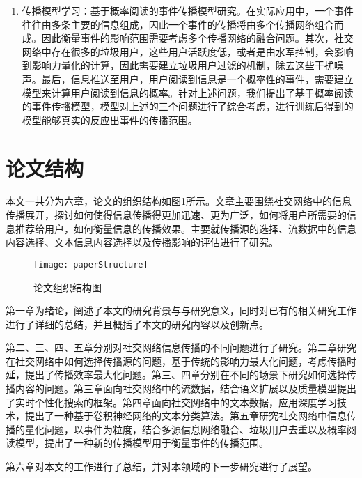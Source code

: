\begin{enumerate}
	\item 传播模型学习：基于概率阅读的事件传播模型研究。在实际应用中，一个事件往往由多条主要的信息组成，因此一个事件的传播将由多个传播网络组合而成。因此衡量事件的影响范围需要考虑多个传播网络的融合问题。其次，社交网络中存在很多的垃圾用户，这些用户活跃度低，或者是由水军控制，会影响到影响力量化的计算，因此需要建立垃圾用户过滤的机制，除去这些干扰噪声。最后，信息推送至用户，用户阅读到信息是一个概率性的事件，需要建立模型来计算用户阅读到信息的概率。针对上述问题，我们提出了基于概率阅读的事件传播模型，模型对上述的三个问题进行了综合考虑，进行训练后得到的模型能够真实的反应出事件的传播范围。
\end{enumerate}
\section{论文结构}
\label{sec1:paperStructure}
本文一共分为六章，论文的组织结构如图\ref{fig:paperStructure}所示。文章主要围绕社交网络中的信息传播展开，探讨如何使得信息传播得更加迅速、更为广泛，如何将用户所需要的信息推荐给用户，如何衡量信息的传播效果。主要就传播源的选择、流数据中的信息内容选择、文本信息内容选择以及传播影响的评估进行了研究。
\begin{figure}[!ht]
    \centering
    \texttt{[image: paperStructure]}
    \caption{论文组织结构图}
    \label{fig:paperStructure}
\end{figure}

第一章为绪论，阐述了本文的研究背景与与研究意义，同时对已有的相关研究工作进行了详细的总结，并且概括了本文的研究内容以及创新点。

第二、三、四、五章分别对社交网络信息传播的不同问题进行了研究。第二章研究在社交网络中如何选择传播源的问题，基于传统的影响力最大化问题，考虑传播时延，提出了传播效率最大化问题。第三、四章分别在不同的场景下研究如何选择传播内容的问题。第三章面向社交网络中的流数据，结合语义扩展以及质量模型提出了实时个性化搜索的框架。第四章面向社交网络中的文本数据，应用深度学习技术，提出了一种基于卷积神经网络的文本分类算法。第五章研究社交网络中信息传播的量化问题，以事件为粒度，结合多源信息网络融合、垃圾用户去重以及概率阅读模型，提出了一种新的传播模型用于衡量事件的传播范围。

第六章对本文的工作进行了总结，并对本领域的下一步研究进行了展望。